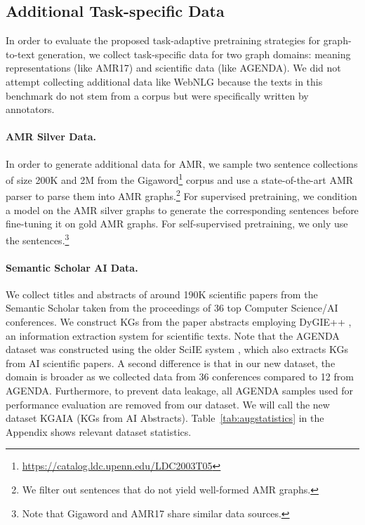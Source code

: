 \documentclass[11pt,a4paper]{article}
\begin{document}
\subsection{Additional Task-specific Data}
In order to evaluate the proposed task-adaptive pretraining strategies for graph-to-text generation, we collect task-specific data for two graph domains: meaning representations (like AMR17) and scientific data (like AGENDA).
We did not attempt collecting additional data like WebNLG because the texts in this benchmark do not stem from a corpus but were specifically written by annotators.



\paragraph{AMR Silver Data.} In order to generate additional data for AMR, we sample two sentence collections of size 200K and 2M from the Gigaword\footnote{\href{https://catalog.ldc.upenn.edu/LDC2003T05}{https://catalog.ldc.upenn.edu/LDC2003T05}} corpus and use a state-of-the-art AMR parser \cite{cai-lam-2020-amr} to parse them into AMR graphs.\footnote{We filter out sentences that do not yield well-formed AMR graphs.} For supervised pretraining, we condition a model on the AMR silver graphs to generate the corresponding sentences before fine-tuning it on gold AMR graphs. For self-supervised pretraining, we only use the sentences.\footnote{Note that Gigaword and AMR17 share similar data sources.}


\paragraph{Semantic Scholar AI Data.} We collect titles and abstracts of around 190K scientific papers from the Semantic Scholar \cite{ammar-etal-2018-construction} taken from the proceedings of 36 top Computer Science/AI conferences. We construct KGs from the paper abstracts employing DyGIE++ \cite{wadden-etal-2019-entity}, an information extraction system for scientific texts. Note that the AGENDA dataset was constructed using the older SciIE system \cite{luan-etal-2018-multi}, which also extracts KGs from AI scientific papers. A second difference is that in our new dataset, the domain is broader as we collected data from 36 conferences compared to 12 from AGENDA. Furthermore, to prevent data leakage, all AGENDA samples used for performance evaluation are removed from our dataset. We will call the new dataset KGAIA (KGs from AI Abstracts). Table~\ref{tab:augstatistics} in the Appendix shows relevant dataset statistics.
\end{document}
